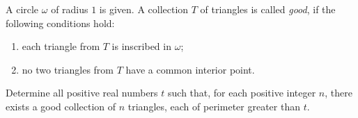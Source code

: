 A circle $\omega$ of radius $1$ is given. A collection $T$ of triangles is called \emph{good}, if the following conditions hold:
\begin{enumerate}
\item[(i)] each triangle from $T$ is inscribed in $\omega$;
\item[(ii)] no two triangles from $T$ have a common interior point.
\end{enumerate}
Determine all positive real numbers $t$ such that, for each positive integer $n$, there exists a good collection of $n$ triangles, each of perimeter greater than $t$.
